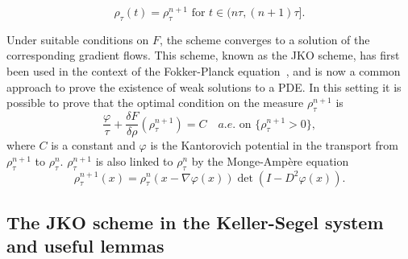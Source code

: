 \documentclass[a4paper,twosided, 11pt]{article}
\newcommand {\f}   {\frac}
\theoremstyle{plain}
\theoremstyle{remark}
\numberwithin{equation}{section}
\begin{document}
\[
\rho_\tau(t) = \rho_\tau^{n+1} \text{ for } t \in (n\tau, (n+1)\tau].
\]

Under suitable conditions on $F$, the scheme converges to a solution of the corresponding gradient flows. This scheme, known as the JKO scheme, has first been used in the context of the Fokker-Planck equation~\cite{MR1617171}, and is now a common approach to prove the existence of weak solutions to a PDE. In this setting it is possible to prove that the optimal condition on the measure $\rho_{\tau}^{n+1}$ is 
$$
\f{\varphi}{\tau} +\frac{\delta F}{\delta \rho}(\rho^{n+1}_{\tau}) = C \quad a.e. \text{ on $\{\rho^{n+1}_{\tau}>0\}$},
$$
where $C$ is a constant and $\varphi$ is the Kantorovich potential in the transport from $\rho^{n+1}_{\tau}$ to $\rho^{n}_{\tau}$. $\rho^{n+1}_{\tau}$ is also linked to $\rho^{n}_{\tau}$ by the Monge-Ampère equation
$$
\rho^{n+1}_{\tau}(x) = \rho^{n}_{\tau}(x-\nabla\varphi(x)) \det(I - D^{2}\varphi(x)). 
$$

\subsection{The JKO scheme in the Keller-Segel system and useful lemmas}
\end{document}
